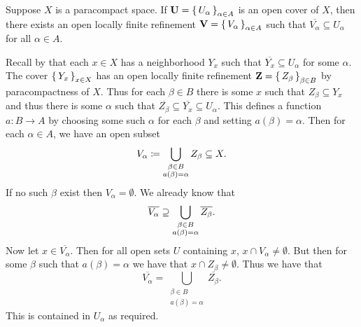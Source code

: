 \documentclass[letterpaper, 11pt, oneside]{book}
\begin{document}
\clearpage

\begin{lem}\label{lem: paracompact_refinement_closed_subset}
  Suppose $X$ is a paracompact space.
  If $\textbf{U} = \set{U_{\alpha}}_{\alpha \in A}$ is an open cover of $X$, then there exists an open locally finite refinement $\textbf{V} = \set{V_{\alpha}}_{\alpha \in A}$ such that $\overline{V_{\alpha}} \subseteq U_{\alpha}$ for all $\alpha \in A$.
\end{lem}
\begin{pf}
  Recall by  that each $x \in X$ has a neighborhood $Y_{x}$ such that $\overline{Y_{x}} \subseteq U_{\alpha}$ for some $\alpha$.
  The cover $\set{Y_{x}}_{x \in X}$ has an open locally finite refinement $\textbf{Z} = \set{Z_{\beta}}_{\beta \in B}$ by paracompactness of $X$.
  Thus for each $\beta \in B$ there is some $x$ such that $Z_{\beta} \subseteq Y_{x}$ and thus there is some $\alpha$ such that $\overline{Z_{\beta}} \subseteq \overline{Y_{x}} \subseteq U_{\alpha}$.
  This defines a function $a\colon B \to A$ by choosing some such $\alpha$ for each $\beta$ and setting $a(\beta) = \alpha$.
  Then for each $\alpha \in A$, we have an open subset
  \[
    V_{\alpha} \coloneqq \bigcup_{\substack{\beta \in B \\ a(\beta) = \alpha}} Z_{\beta} \subseteq X.
  \]
  If no such $\beta$ exist then $V_{\alpha} = \emptyset$.
  We already know that
  \[
    \overline{V_{\alpha}} \supseteq \bigcup_{\substack{\beta \in B \\ a(\beta) = \alpha}} \overline{Z_{\beta}}.
  \]
  Now let $x \in \overline{V_{\alpha}}$.
  Then for all open sets $U$ containing $x$, $x \cap V_{\alpha} \neq \emptyset$.
  But then for some $\beta$ such that $a(\beta) = \alpha$ we have that $x \cap Z_{\beta} \neq \emptyset$.
  Thus we have that
  \[
    \overline{V_{\alpha}} = \bigcup_{\substack{\beta \in B \\ a(\beta) = \alpha}} \overline{Z_{\beta}}.
  \]
  This is contained in $U_{\alpha}$ as required.
\end{pf}
\end{document}
